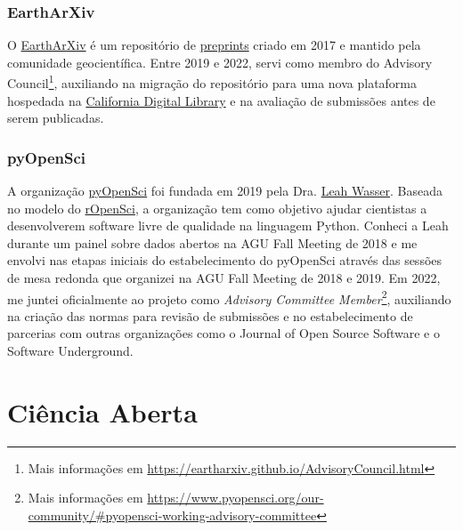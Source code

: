 \documentclass[10pt,a4paper,oneside]{book}
\begin{document}
\subsection{EarthArXiv}

O \href{https://eartharxiv.org/}{EarthArXiv} é um repositório de
\href{https://en.wikipedia.org/wiki/Preprint}{preprints} criado em 2017 e
mantido pela comunidade geocientífica.
Entre 2019 e 2022, servi como membro do
Advisory Council\footnote{Mais informações em \url{https://eartharxiv.github.io/AdvisoryCouncil.html}},
auxiliando na migração do repositório para uma nova plataforma hospedada na
\href{https://cdlib.org/}{California Digital Library} e na avaliação de
submissões antes de serem publicadas.

\subsection{pyOpenSci}

A organização \href{https://www.pyopensci.org/}{pyOpenSci} foi fundada em
2019 pela Dra. \href{https://www.leahwasser.com}{Leah Wasser}.
Baseada no modelo do \href{https://ropensci.org/}{rOpenSci}, a organização tem
como objetivo ajudar cientistas a desenvolverem software livre de qualidade na
linguagem Python.
Conheci a Leah durante um painel sobre dados abertos na AGU Fall Meeting de
2018 e me envolvi nas etapas iniciais do estabelecimento do pyOpenSci através
das sessões de mesa redonda que organizei na AGU Fall Meeting de 2018 e 2019.
Em 2022, me juntei oficialmente ao projeto como
\textit{Advisory Committee Member}\footnote{Mais informações em
\url{https://www.pyopensci.org/our-community/\#pyopensci-working-advisory-committee}},
auxiliando na criação das normas para revisão de submissões e no estabelecimento
de parcerias com outras organizações como o Journal of Open Source Software e
o Software Underground.


\chapter{Ciência Aberta}
\label{cap_cienciaaberta}
\end{document}
